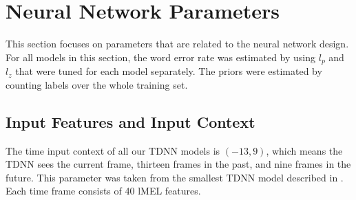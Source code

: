 \section{Neural Network Parameters}
This section focuses on parameters that are related to the neural network design. For all models in this section, the word error rate was estimated by using $l_p$ and $l_z$ that were tuned for each model separately. The priors were estimated by counting labels over the whole training set.
\subsection{Input Features and Input Context}
The time input context of all our TDNN models is $(-13,9)$, which means the TDNN sees the current frame, thirteen frames in the past, and nine frames in the future. This parameter was taken from the smallest TDNN model described in \cite{peddinti2015reverberation}.
Each time frame consists of 40 lMEL features. 
